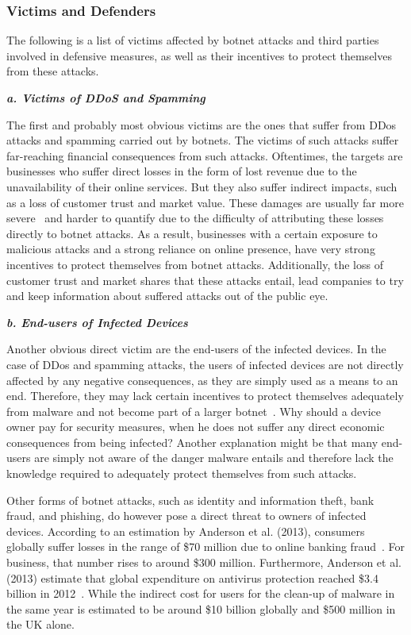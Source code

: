 \subsubsection{Victims and Defenders}
The following is a list of victims affected by botnet attacks and third parties involved in defensive measures, as well as their incentives to protect themselves from these attacks.

\textbf{\textit{a. Victims of DDoS and Spamming}}

The first and probably most obvious victims are the ones that suffer from DDos attacks and spamming carried out by botnets.
The victims of such attacks suffer far-reaching financial consequences from such attacks.
Oftentimes, the targets are businesses who suffer direct losses in the form of lost revenue due to the unavailability of their online services.
But they also suffer indirect impacts, such as a loss of customer trust and market value.
These damages are usually far more severe~\cite{Anderson13} and harder to quantify due to the difficulty of attributing these losses directly to botnet attacks.
As a result, businesses with a certain exposure to malicious attacks and a strong reliance on online presence, have very strong incentives to protect themselves from botnet attacks.
Additionally, the loss of customer trust and market shares that these attacks entail, lead companies to try and keep information about suffered attacks out of the public eye.

\textbf{\textit{b. End-users of Infected Devices}}

Another obvious direct victim are the end-users of the infected devices.
In the case of DDos and spamming attacks, the users of infected devices are not directly affected by any negative consequences, as they are simply used as a means to an end.
Therefore, they may lack certain incentives to protect themselves adequately from malware and not become part of a larger botnet~\cite{Asghari15}.
Why should a device owner pay for security measures, when he does not suffer any direct economic consequences from being infected?
Another explanation might be that many end-users are simply not aware of the danger malware entails and therefore lack the knowledge required to adequately protect themselves from such attacks.

Other forms of botnet attacks, such as identity and information theft, bank fraud, and phishing, do however pose a direct threat to owners of infected devices.
According to an estimation by Anderson et al. (2013), consumers globally suffer losses in the range of \$70 million due to online banking fraud~\cite{Anderson13}.
For business, that number rises to around \$300 million.
Furthermore, Anderson et al. (2013) estimate that global expenditure on antivirus protection reached \$3.4 billion in 2012~\cite{Anderson13}.
While the indirect cost for users for the clean-up of malware in the same year is estimated to be around \$10 billion globally and \$500 million in the UK alone.


